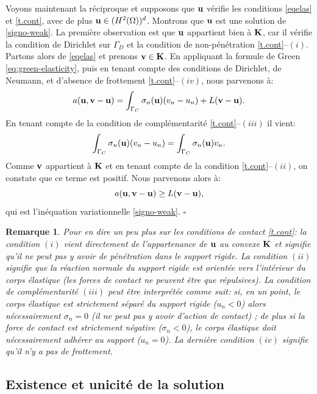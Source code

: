 \documentclass[11pt]{book}
\newtheorem{remark}[theorem]{Remarque}
\newcommand{\br}{\begin{remark}}
\newcommand{\er}{\end{remark}}
\newcommand{\cqfd}{{$\mbox{}$\hfill$\square$}}
\def\u{{\bf u}}
\def\vv{{\bf v}}
\def\K{{\bf K}}
\newcommand{\dg}{d\Gamma}
\begin{document}
Voyons maintenant la réciproque et supposons que $\u$ vérifie les conditions \eqref{eqelas} et \eqref{t.cont}, avec de plus  $\u \in (H^2(\Omega))^d$. Montrons que $\u$ est une solution de \eqref{signo-weak}. La première observation est que $\u$ appartient bien à $\K$, car il vérifie la condition de Dirichlet sur $\Gamma_D$ et la condition de non-pénétration \eqref{t.cont}--$(i)$. Partons alors de \eqref{eqelas} et prenons $\vv \in \K$. En appliquant la formule de Green \eqref{eq:green-elasticity}, puis en tenant compte des conditions de Dirichlet, de Neumann, et d'absence de frottement \eqref{t.cont}--$(iv)$, nous parvenons à:
 \[
 a(\u,\vv - \u ) =
 \int_{\Gamma_C} \sigma_n (\u) (v_n - u_n) %
 + L(\vv - \u). 
 \] 
En tenant compte de la condition de complémentarité \eqref{t.cont}--$(iii)$ il vient:
 \[
 \int_{\Gamma_C} \sigma_n (\u) (v_n - u_n) %
 = 
 \int_{\Gamma_C} \sigma_n (\u) v_n.  %
 \] 
Comme $\vv$ appartient à $\K$ et en tenant compte de la condition \eqref{t.cont}--$(ii)$, on constate que ce terme est positif.
Nous parvenons alors à:
 \[
 a(\u,\vv - \u ) 
 \geq L(\vv - \u), 
 \] 
 qui est l'inéquation variationnelle \eqref{signo-weak}. \cqfd 
 
 \smallskip
 
\br Pour en dire un peu plus sur les conditions de contact \eqref{t.cont}: la condition $(i)$ vient directement de l'appartenance de $\u$ au convexe $\K$ et signifie qu'il ne peut pas y avoir de pénétration dans le support rigide. La condition $(ii)$ signifie que la réaction normale du support rigide est orientée vers l'intérieur du corps élastique (les forces de contact ne peuvent être que répulsives). La condition de complémentarité  $(iii)$ peut être interprétée comme suit: si, en un point, le corps élastique est strictement séparé du support rigide ($u_n < 0$) alors nécessairement $\sigma_n = 0$ (il ne peut pas y avoir d'action de contact) ; de plus si la force de contact est strictement négative ($\sigma_n < 0$), le corps élastique doit nécessairement adhérer au support ($u_n = 0$).
La dernière condition $(iv)$ signifie qu'il n'y a pas de frottement.
\er

\subsection{Existence et unicit\'e de la solution}
\end{document}
